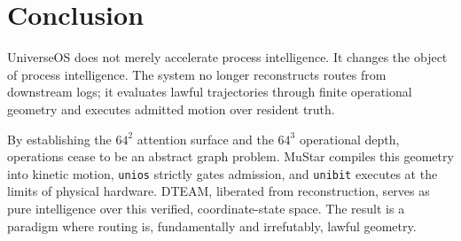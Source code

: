\chapter{Conclusion}

UniverseOS does not merely accelerate process intelligence. It changes the object of process intelligence. The system no longer reconstructs routes from downstream logs; it evaluates lawful trajectories through finite operational geometry and executes admitted motion over resident truth.

By establishing the $64^2$ attention surface and the $64^3$ operational depth, operations cease to be an abstract graph problem. MuStar compiles this geometry into kinetic motion, \texttt{unios} strictly gates admission, and \texttt{unibit} executes at the limits of physical hardware. DTEAM, liberated from reconstruction, serves as pure intelligence over this verified, coordinate-state space. The result is a paradigm where routing is, fundamentally and irrefutably, lawful geometry.